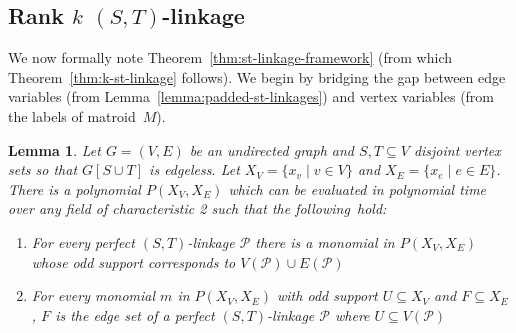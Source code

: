 \documentclass[10pt,a4paper]{article}
\newtheorem{lemma}{Lemma}[section]
\newcommand{\cP}{\ensuremath{\mathcal P}\xspace}
\begin{document}
\subsection{Rank \texorpdfstring{$k$ $(S,T)$}{k (S,T)}-linkage}

We now formally note Theorem~\ref{thm:st-linkage-framework}
(from which Theorem~\ref{thm:k-st-linkage} follows). 
We begin by bridging the gap between edge variables (from
Lemma~\ref{lemma:padded-st-linkages}) and vertex variables (from the
labels of matroid~$M$). 

\begin{lemma} \label{lemma:linkage-vertex-vars}
  Let $G=(V,E)$ be an undirected graph and $S, T \subseteq V$
  disjoint vertex sets so that $G[S \cup T]$ is edgeless.
  Let $X_V=\{x_v \mid v \in V\}$ and $X_E=\{x_e \mid e \in E\}$. 
  There is a polynomial $P(X_V,X_E)$ which can be evaluated in
  polynomial time over any field of characteristic 2
  such that the following~hold:
  \begin{enumerate}
  \item For every perfect $(S,T)$-linkage $\cP$ there is a monomial in $P(X_V,X_E)$
    whose odd support corresponds to $V(\cP) \cup E(\cP)$
  \item For every monomial $m$ in $P(X_V,X_E)$ with odd support
    $U \subseteq X_V$ and $F \subseteq X_E$, $F$ is the edge set of a
    perfect $(S,T)$-linkage $\cP$ where $U \subseteq V(\cP)$
  \end{enumerate}
\end{lemma}
\end{document}
